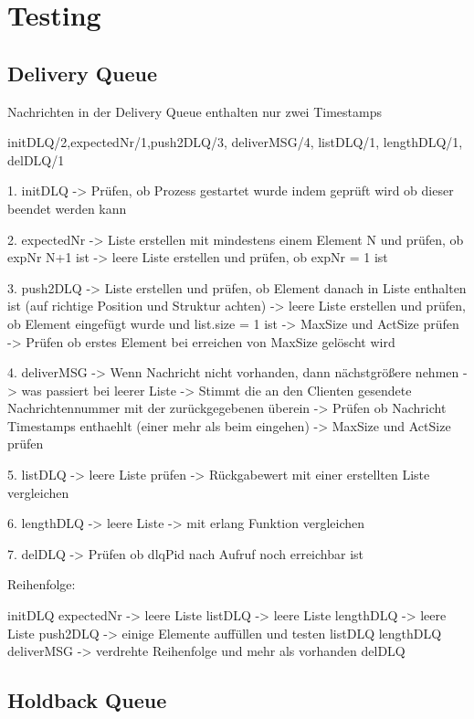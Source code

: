 \section{Testing}

\subsection{Delivery Queue}

Nachrichten in der Delivery Queue enthalten nur zwei Timestamps 

initDLQ/2,expectedNr/1,push2DLQ/3, deliverMSG/4, listDLQ/1, lengthDLQ/1, delDLQ/1

1. initDLQ
-> Prüfen, ob Prozess gestartet wurde indem geprüft wird ob dieser beendet werden kann

2. expectedNr
-> Liste erstellen mit mindestens einem Element N und prüfen, ob expNr N+1 ist
-> leere Liste erstellen und prüfen, ob expNr = 1 ist

3. push2DLQ
-> Liste erstellen und prüfen, ob Element danach in Liste enthalten ist (auf richtige Position und Struktur achten)
-> leere Liste erstellen und prüfen, ob Element eingefügt wurde und list.size = 1 ist 
-> MaxSize und ActSize prüfen
-> Prüfen ob erstes Element bei erreichen von MaxSize gelöscht wird 

4. deliverMSG
-> Wenn Nachricht nicht vorhanden, dann nächstgrößere nehmen
-> was passiert bei leerer Liste 
-> Stimmt die an den Clienten gesendete Nachrichtennummer mit der zurückgegebenen überein
-> Prüfen ob Nachricht Timestamps enthaehlt (einer mehr als beim eingehen)
-> MaxSize und ActSize prüfen

5. listDLQ
-> leere Liste prüfen 
-> Rückgabewert mit einer erstellten Liste vergleichen 

6. lengthDLQ
-> leere Liste 
-> mit erlang Funktion vergleichen 

7. delDLQ
-> Prüfen ob dlqPid nach Aufruf noch erreichbar ist 

Reihenfolge:

initDLQ
expectedNr -> leere Liste 
listDLQ -> leere Liste
lengthDLQ -> leere Liste
push2DLQ -> einige Elemente auffüllen und testen 
listDLQ 
lengthDLQ
deliverMSG -> verdrehte Reihenfolge und mehr als vorhanden
delDLQ

\subsection{Holdback Queue}

